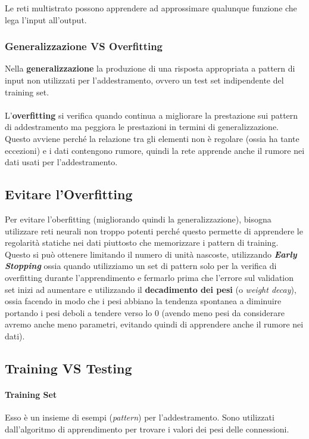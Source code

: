 \documentclass[12pt, a4paper]{article}
\begin{document}
Le reti multistrato possono apprendere ad approssimare qualunque funzione che lega l'input all'output.\\

\subsubsection{Generalizzazione VS Overfitting}
Nella \textbf{generalizzazione} la produzione di una risposta appropriata a pattern di input non utilizzati per l'addestramento, ovvero un test set indipendente del training set.
\\\\
L'\textbf{overfitting} si verifica quando continua a migliorare la prestazione sui pattern di addestramento ma peggiora le prestazioni in termini di generalizzazione.\\
Questo avviene perché la relazione tra gli elementi non è regolare (ossia ha tante eccezioni) e i dati contengono rumore, quindi la rete apprende anche il rumore nei dati usati per l'addestramento.

\subsection{Evitare l'Overfitting}
Per evitare l'oberfitting (migliorando quindi la generalizzazione), bisogna utilizzare reti neurali non troppo potenti perché questo permette di apprendere le regolarità statiche nei dati piuttosto che memorizzare i pattern di training. Questo si può ottenere limitando il numero di unità nascoste,
utilizzando \textbf{\textit{Early Stopping}} ossia quando utilizziamo un set di pattern solo per la verifica di overfitting durante l'apprendimento e fermarlo prima che l'errore sul validation set inizi ad aumentare e utilizzando il \textbf{decadimento dei pesi} (o \textit{weight decay}), ossia facendo in modo che i pesi abbiano la tendenza spontanea a diminuire portando i pesi deboli a tendere verso lo 0 (avendo meno pesi da considerare avremo anche meno parametri, evitando quindi di apprendere anche il rumore nei dati).

\subsection{Training VS Testing}
\paragraph{Training Set}
Esso è un insieme di esempi (\textit{pattern}) per l'addestramento. Sono utilizzati dall'algoritmo di apprendimento per trovare i valori dei pesi delle connessioni.
\end{document}
